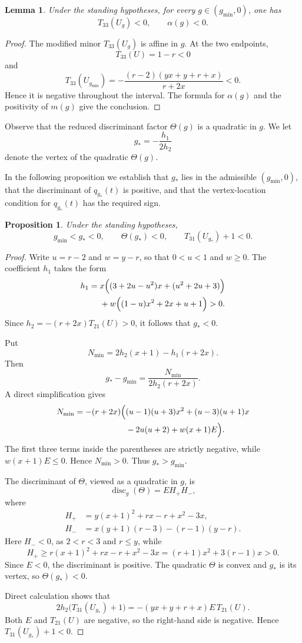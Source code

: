 \documentclass[11pt,onecolumn]{amsart}
\theoremstyle{plain}
\newtheorem{proposition}[theorem]{Proposition}
\newtheorem{lemma}[theorem]{Lemma}
\theoremstyle{definition}
\theoremstyle{remark}
\newcommand{\disc}{\operatorname{disc}}
\begin{document}
\begin{lemma}
\label{lem:X23-concavity}
Under the standing hypotheses, for every $g\in(g_{\min},0)$, one has
\[
T_{33}(U_g)<0,
\qquad
\alpha(g)<0.
\]
\end{lemma}

\begin{proof}
The modified minor $T_{33}(U_g)$ is affine in $g$.  At the two endpoints,
\[
T_{33}(U)=1-r<0
\]
and
\[
T_{33}(U_{g_{\min}})
=-\frac{(r-2)(yx+y+r+x)}{r+2x}<0.
\]
Hence it is negative throughout the interval.  The formula for
$\alpha(g)$ and the positivity of $m(g)$ give the conclusion.
\end{proof}

Observe that the reduced discriminant factor $\Theta(g)$ is a quadratic in $g$.
We let
\[
g_*=-\frac{h_1}{2h_2}
\]
denote the vertex of the quadratic $\Theta(g)$.

In the following proposition we establish that $g_*$ lies in the admissible $(g_{\min},0)$, that the discriminant of $q_{g_*}(t)$ is positive, and that the vertex-location condition for $q_{g_*}(t)$ has the required sign.


\begin{proposition}
\label{prop:X23-automatic-signs}
Under the standing hypotheses,
\[
g_{\min}<g_*<0,
\qquad
\Theta(g_*)<0,
\qquad
T_{31}(U_{g_*})+1<0.
\]
\end{proposition}

\begin{proof}
Write $u=r-2$ and $w=y-r$, so that
$0<u<1$ and $w\geq 0$.  The coefficient $h_1$ takes the form
\[
\begin{aligned}
h_1={}&x\Bigl((3+2u-u^2)x+(u^2+2u+3)\Bigr)\\
&+w\Bigl((1-u)x^2+2x+u+1\Bigr)>0.
\end{aligned}
\]
Since $h_2=-(r+2x)T_{21}(U)>0$, it follows that $g_*<0$.

Put
\[
N_{\min}=2h_2(x+1)-h_1(r+2x).
\]
Then
\[
g_*-g_{\min}
=\frac{N_{\min}}{2h_2(r+2x)}.
\]
A direct simplification gives
\[
\begin{aligned}
N_{\min}=-(r+2x)\Bigl(&
(u-1)(u+3)x^2+(u-3)(u+1)x\\
&-2u(u+2)+w(x+1)E\Bigr).
\end{aligned}
\]
The first three terms inside the parentheses are strictly negative,
while $w(x+1)E\leq0$. Hence $N_{\min}>0$. Thus $g_*>g_{\min}$.

The discriminant of $\Theta$, viewed as a quadratic in $g$, is
\[
\disc_g(\Theta)=EH_+H_-,
\]
where
\begin{align*}
H_+ &=y(x+1)^2+rx-r+x^2-3x,\\
H_- &=x(y+1)(r-3)-(r-1)(y-r).
\end{align*}
Here $H_-<0$, as $2< r<3$ and $r\leq y$, while
\[
H_+\geq r(x+1)^2+rx-r+x^2-3x
=(r+1)x^2+3(r-1)x>0.
\]
Since $E<0$, the discriminant is positive.  The quadratic
$\Theta$ is convex and $g_*$ is its vertex, so
$\Theta(g_*)<0$.

Direct calculation shows that
\[
2h_2\bigl(T_{31}(U_{g_*})+1\bigr)
=-(yx+y+r+x)E\,T_{21}(U).
\]
Both $E$ and $T_{21}(U)$ are negative, so the right-hand side is
negative.  Hence $T_{31}(U_{g_*})+1<0$.
\end{proof}
\end{document}
